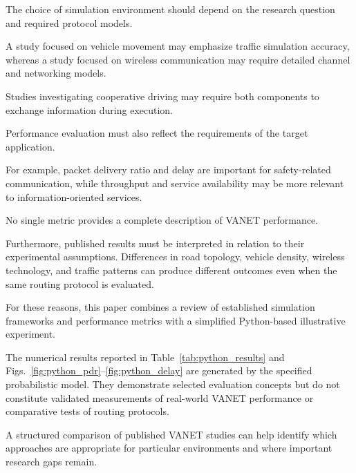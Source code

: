 The choice of simulation
environment should depend
on the research question
and required protocol models.

A study focused on vehicle
movement may emphasize
traffic simulation accuracy,
whereas a study focused on
wireless communication may
require detailed channel
and networking models.

Studies investigating
cooperative driving may
require both components
to exchange information
during execution.

Performance evaluation
must also reflect the
requirements of the
target application.

For example, packet delivery
ratio and delay are important
for safety-related communication,
while throughput and service
availability may be more relevant
to information-oriented services.

No single metric provides
a complete description
of VANET performance.

Furthermore, published results
must be interpreted in relation
to their experimental assumptions.
Differences in road topology,
vehicle density, wireless
technology, and traffic patterns
can produce different outcomes
even when the same routing
protocol is evaluated.

For these reasons, this paper combines
a review of established simulation
frameworks and performance metrics
with a simplified Python-based
illustrative experiment.

The numerical results reported in
Table~\ref{tab:python_results} and
Figs.~\ref{fig:python_pdr}--\ref{fig:python_delay}
are generated by the specified
probabilistic model. They demonstrate
selected evaluation concepts but do
not constitute validated measurements
of real-world VANET performance or
comparative tests of routing protocols.

A structured comparison of
published VANET studies can
help identify which approaches
are appropriate for particular
environments and where
important research gaps remain.
